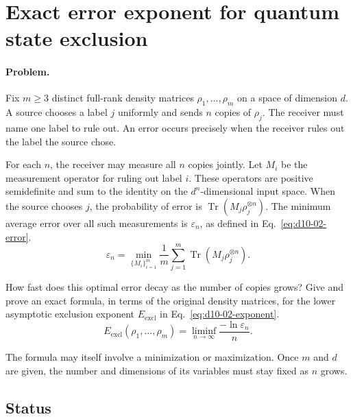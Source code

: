 \section{Exact error exponent for quantum state exclusion}
\label{sec:op_62429171778f2136}

\paragraph{Problem.}
Fix $m\geq 3$ distinct full-rank density matrices $\rho_1,\ldots,\rho_m$ on a space of dimension $d$. A source chooses a label $j$ uniformly and sends $n$ copies of $\rho_j$. The receiver must name one label to rule out. An error occurs precisely when the receiver rules out the label the source chose.

For each $n$, the receiver may measure all $n$ copies jointly. Let $M_i$ be the measurement operator for ruling out label $i$. These operators are positive semidefinite and sum to the identity on the $d^n$-dimensional input space. When the source chooses $j$, the probability of error is $\operatorname{Tr}(M_j\rho_j^{\otimes n})$. The minimum average error over all such measurements is $\varepsilon_n$, as defined in Eq.~\eqref{eq:d10-02-error}.
\begin{equation}
 \varepsilon_n=\min_{\{M_i\}_{i=1}^{m}}\frac{1}{m}\sum_{j=1}^{m}\operatorname{Tr}(M_j\rho_j^{\otimes n}).
 \label{eq:d10-02-error}
\end{equation}

How fast does this optimal error decay as the number of copies grows? Give and prove an exact formula, in terms of the original density matrices, for the lower asymptotic exclusion exponent $E_{\mathrm{excl}}$ in Eq.~\eqref{eq:d10-02-exponent}.
\begin{equation}
 E_{\mathrm{excl}}(\rho_1,\ldots,\rho_m)=\liminf_{n\to\infty}\frac{-\ln\varepsilon_n}{n}.
 \label{eq:d10-02-exponent}
\end{equation}

The formula may itself involve a minimization or maximization. Once $m$ and $d$ are given, the number and dimensions of its variables must stay fixed as $n$ grows.

\subsection*{Status}

